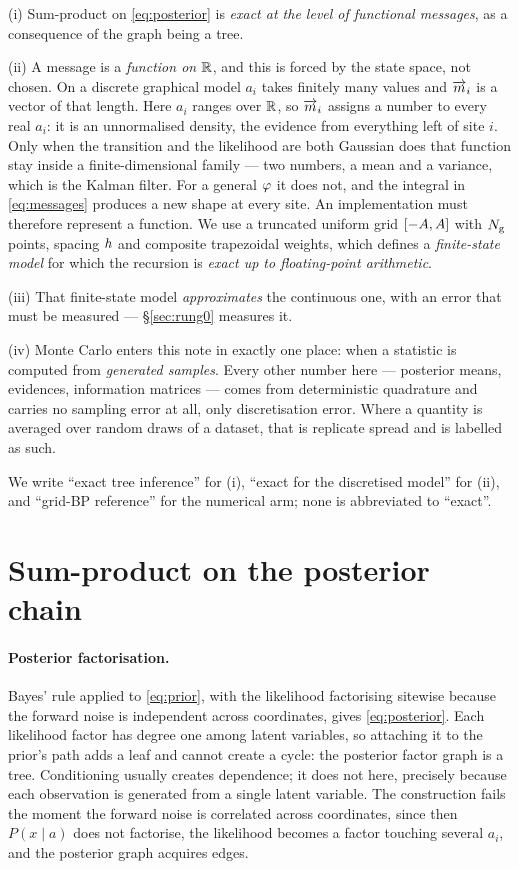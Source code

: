 (i) Sum-product on \eqref{eq:posterior} is \emph{exact at the level of functional messages}, as a
consequence of the graph being a tree.

(ii) A message is a \emph{function on $\mathbb{R}$}, and this is forced by the state space, not chosen.
On a discrete graphical model $a_i$ takes finitely many values and $\overrightarrow{m}_i$ is a vector of that
length. Here $a_i$ ranges over $\mathbb{R}$, so $\overrightarrow{m}_i$ assigns a number to every real $a_i$: it is
an unnormalised density, the evidence from everything left of site $i$. Only when the transition
and the likelihood are both Gaussian does that function stay inside a finite-dimensional family
--- two numbers, a mean and a variance, which is the Kalman filter. For a general $\varphi$ it does
not, and the integral in \eqref{eq:messages} produces a new shape at every site. An implementation
must therefore represent a function. We use a truncated uniform grid
$[-A,A]$ with $N_{\mathrm{g}}$ points, spacing $h$ and composite trapezoidal
weights, which defines a \emph{finite-state model} for which the recursion is \emph{exact up to
floating-point arithmetic}.

(iii) That finite-state model \emph{approximates} the continuous one, with an error that must be
measured --- \S\ref{sec:rung0} measures it.

(iv) Monte Carlo enters this note in exactly one place: when a statistic is computed from
\emph{generated samples}. Every other number here --- posterior means, evidences, information
matrices --- comes from deterministic quadrature and carries no sampling error at all, only
discretisation error. Where a quantity is averaged over random draws of a dataset, that is
replicate spread and is labelled as such.

We write ``exact tree inference'' for (i), ``exact for the discretised model'' for (ii), and
``grid-BP reference'' for the numerical arm; none is abbreviated to ``exact''.

\section{Sum-product on the posterior chain}
\label{app:bp}

\paragraph{Posterior factorisation.} Bayes' rule applied to \eqref{eq:prior}, with the likelihood
factorising sitewise because the forward noise is independent across coordinates, gives
\eqref{eq:posterior}. Each likelihood factor has degree one among latent variables, so attaching
it to the prior's path adds a leaf and cannot create a cycle: the posterior factor graph is a
tree. Conditioning usually creates dependence; it does not here, precisely because each
observation is generated from a single latent variable. The construction fails the moment the
forward noise is correlated across coordinates, since then $P(x\mid a)$ does not factorise, the
likelihood becomes a factor touching several $a_i$, and the posterior graph acquires edges.

